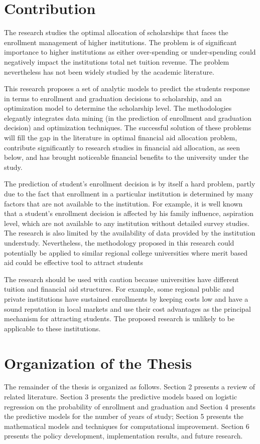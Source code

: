 \documentclass[12pt,english]{report}
\begin{document}
\section{Contribution}

The research studies the optimal allocation of scholarships that faces the
enrollment management of higher institutions.  The problem is of significant
importance to higher institutions as either over-spending or under-spending
could negatively impact the institutions total net tuition revenue.  The
problem nevertheless has not been widely studied by the academic literature.

This research proposes  a set of analytic models to predict the students
response in terms to enrollment and graduation decisions to scholarship, and an
optimization model to determine the scholarship level.  The methodologies
elegantly integrates data mining (in the prediction of enrollment and
graduation decision) and optimization techniques. The successful solution of
these problems will fill the gap in the literature in optimal financial aid
allocation problem, contribute significantly to research studies in financial
aid allocation, as seen below, and has brought noticeable financial benefits to
the university under the study.

The prediction of student's enrollment decision is by itself a hard problem,
partly due to the fact that enrollment in a particular institution is
determined
by many factors that are not available to the institution.  For example, it is
well known that a student's enrollment decision is affected by his family
influence, aspiration level, which are not available to any institution without
detailed survey studies.  The research is also limited by the availability of
data provided by the institution understudy.   Nevertheless, the methodology
proposed in this research could potentially be applied to similar regional
college universities where merit based aid could be effective tool to attract
students

The research should be used with caution because universities have different
tuition and financial aid structures.  For example, some regional public and
private institutions have sustained enrollments by keeping costs low and have a
sound reputation in local markets and use their cost advantages as the
principal mechanism for attracting students.  The proposed research is unlikely
to be applicable to these institutions.

\section{Organization of the Thesis}
\vspace{0.25in}
The remainder of the thesis is organized as follows. Section 2 presents a
review of related literature. Section 3 presents the predictive models based on
logistic regression on the probability of enrollment and graduation and Section
4 presents the predictive models for the number of years of study; Section 5
presents the mathematical models and techniques for computational improvement.
Section 6 presents the policy development, implementation results, and future
research.
\end{document}

